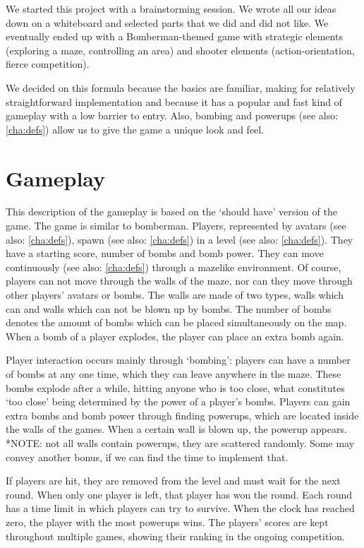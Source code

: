 \documentclass[a4paper,twoside,11pt]{report}
\begin{document}
We started this project with a brainstorming session. We wrote all our ideas down on a whiteboard and selected parts that we did and did not like. We eventually ended up with a Bomberman-themed game with strategic elements (exploring a maze, controlling an area) and shooter elements (action-orientation, fierce competition).

We decided on this formula because the basics are familiar, making for relatively straightforward implementation and because it has a popular and fast kind of gameplay with a low barrier to entry. Also, bombing and powerups (see also: \ref{cha:defs}) allow us to give the game a unique look and feel.


\chapter{Gameplay}
This description of the gameplay is based on the `should have' version of the game. The game is similar to bomberman. Players, represented by avatars (see also: \ref{cha:defs}), spawn (see also: \ref{cha:defs}) in a level (see also: \ref{cha:defs}). They have a starting score, number of bombs and bomb power. They can move continuously (see also: \ref{cha:defs}) through a mazelike environment. Of course, players can not move through the walls of the maze, nor can they move through other players' avatars or bombs. The walls are made of two types, walls which can and walls which can not be blown up by bombs. The number of bombs denotes the amount of bombs which can be placed simultaneously on the map. When a bomb of a player explodes, the player can place an extra bomb again.

Player interaction occurs mainly through `bombing': players can have a number of bombs at any one time, which they can leave anywhere in the maze. These bombs explode after a while, hitting anyone who is too close, what constitutes `too close' being determined by the power of a player's bombs. Players can gain extra bombs and bomb power through finding powerups, which are located inside the walls of the games. When a certain wall is blown up, the powerup appears. *NOTE: not all walls contain powerups, they are scattered randomly. Some may convey another bonus, if we can find the time to implement that.

If players are hit, they are removed from the level and must wait for the next round. When only one player is left, that player has won the round. Each round has a time limit in which players can try to survive. When the clock has reached zero, the player with the most powerups wins. The players' scores are kept throughout multiple games, showing their ranking in the ongoing competition.
\end{document}
